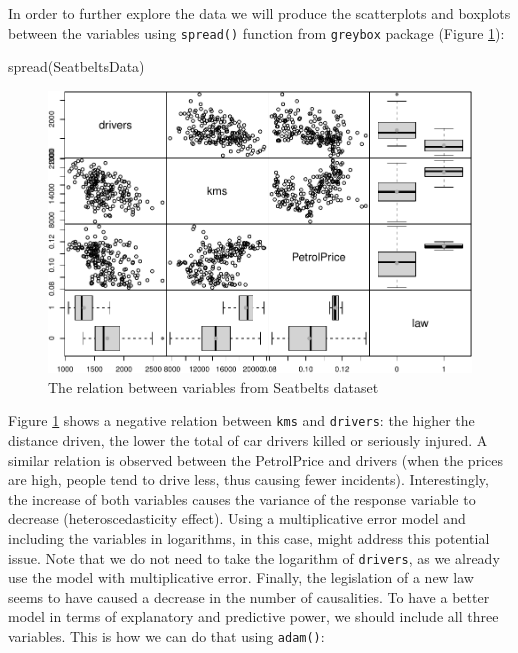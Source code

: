 \documentclass[
]{book}
\newenvironment{Shaded}{\begin{snugshade}}{\end{snugshade}}
\newcommand{\FunctionTok}[1]{\textcolor[rgb]{0.00,0.00,0.00}{#1}}
\newcommand{\NormalTok}[1]{#1}
\theoremstyle{definition}
\theoremstyle{definition}
\theoremstyle{definition}
\theoremstyle{definition}
\theoremstyle{remark}
\begin{document}
In order to further explore the data we will produce the scatterplots and boxplots between the variables using \texttt{spread()} function from \texttt{greybox} package (Figure \ref{fig:driversSpread}):

\begin{Shaded}
\begin{Highlighting}[]
\FunctionTok{spread}\NormalTok{(SeatbeltsData)}
\end{Highlighting}
\end{Shaded}

\begin{figure}
\centering
\includegraphics{Svetunkov--2022----ADAM_files/figure-latex/driversSpread-1.pdf}
\caption{\label{fig:driversSpread}The relation between variables from Seatbelts dataset}
\end{figure}

Figure \ref{fig:driversSpread} shows a negative relation between \texttt{kms} and \texttt{drivers}: the higher the distance driven, the lower the total of car drivers killed or seriously injured. A similar relation is observed between the PetrolPrice and drivers (when the prices are high, people tend to drive less, thus causing fewer incidents). Interestingly, the increase of both variables causes the variance of the response variable to decrease (heteroscedasticity effect). Using a multiplicative error model and including the variables in logarithms, in this case, might address this potential issue. Note that we do not need to take the logarithm of \texttt{drivers}, as we already use the model with multiplicative error. Finally, the legislation of a new law seems to have caused a decrease in the number of causalities. To have a better model in terms of explanatory and predictive power, we should include all three variables. This is how we can do that using \texttt{adam()}:
\end{document}
